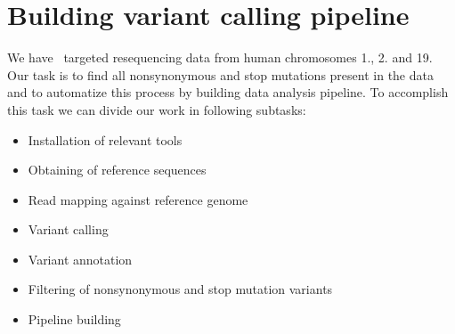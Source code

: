 \section{Building variant calling pipeline}
We have \IonTorrent~targeted resequencing data from human chromosomes 1., 2. and 19. 
Our task is to find all nonsynonymous and stop mutations present in the data
and to automatize this process by building data analysis pipeline.
To accomplish this task we can divide our work in following subtasks:
\begin{itemize}
  \item Installation of relevant tools
  \item Obtaining of reference sequences
  \item Read mapping against reference genome
  \item Variant calling
  \item Variant annotation
  \item Filtering of nonsynonymous and stop mutation variants
  \item Pipeline building
\end{itemize}


